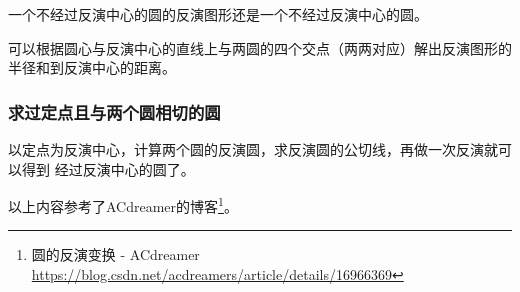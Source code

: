 \begin{property}
	一个不经过反演中心的圆的反演图形还是一个不经过反演中心的圆。
\end{property}
可以根据圆心与反演中心的直线上与两圆的四个交点（两两对应）解出反演图形的
半径和到反演中心的距离。

\subsubsection{求过定点且与两个圆相切的圆}
以定点为反演中心，计算两个圆的反演圆，求反演圆的公切线，再做一次反演就可以得到
经过反演中心的圆了。

以上内容参考了ACdreamer的博客\footnote{
	圆的反演变换 - ACdreamer\\
	\url{https://blog.csdn.net/acdreamers/article/details/16966369}
}。
